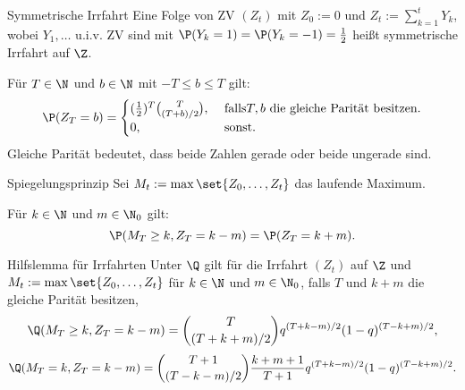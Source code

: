 \begin{karte}{Symmetrische Irrfahrt}
Eine Folge von ZV \((Z_t)\) mit \(Z_0 := 0\) und \(Z_t := \sum_{k=1}^t Y_k\), 
wobei \(Y_1, \ldots\) u.i.v. ZV sind mit \(\P(Y_k = 1) = \P(Y_k = -1) = \frac{1}{2}\) heißt symmetrische Irrfahrt auf \(\Z\).

Für \(T\in \N\) und \(b\in\N\) mit \(-T\leq b\leq T\) gilt: 
\[ \P(Z_T = b) = \begin{cases}
    (\frac{1}{2})^T \binom{T}{(T+b)/2}, &\text{ falls} T, b \text{ die gleiche Parität besitzen.} \\
    0, & \text{ sonst}.
\end{cases} \]
Gleiche Parität bedeutet, dass beide Zahlen gerade oder beide ungerade sind.
\end{karte}

\begin{karte}{Spiegelungsprinzip}
Sei \(M_t := \max\set{ Z_0, \ldots, Z_t }\) das laufende Maximum. 

Für \(k\in\N\) und \(m\in\N_0\) gilt: 
\[ \P(M_T\geq k, Z_T = k-m) = \P(Z_T = k+m). \]
\end{karte}

\begin{karte}{Hilfslemma für Irrfahrten}
Unter \(\Q\) gilt für die Irrfahrt \((Z_t)\) auf \(\Z\) und \(M_t := \max\set{Z_0,\ldots, Z_t}\) 
für \(k\in\N\) und \(m\in\N_0\), falls \(T\) und \(k+m\) die gleiche Parität besitzen, 
\[ \Q(M_T \geq k, Z_T = k-m) = \binom{T}{(T+k+m)/2} q^{(T+k-m)/2} (1-q)^{(T-k+m)/2}, \]
\[ \Q(M_T = k, Z_T = k-m) = \binom{T+1}{(T-k-m)/2} \frac{k+m+1}{T+1} q^{(T+k-m)/2} (1-q)^{(T-k+m)/2}. \]
\end{karte}
